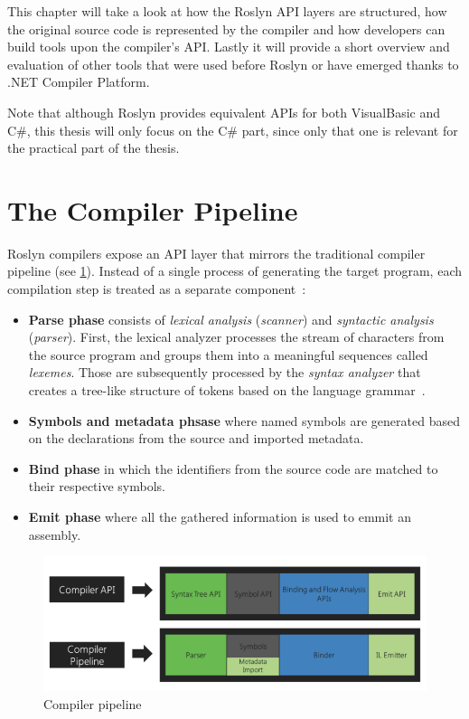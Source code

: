 \documentclass[
  digital, %
  table,   %
  lof,     %
  lot,     %
  oneside,
]{fithesis3}
\begin{document}
This chapter will take a look at how the Roslyn API layers are structured, how the original source code is represented by the compiler and how developers can build tools upon the compiler's API. Lastly it will provide a short overview and evaluation of other tools that were used before Roslyn or have emerged thanks to .NET Compiler Platform.

Note that although Roslyn provides equivalent APIs for both VisualBasic and C\#, this thesis will only focus on the C\# part, since only that one is relevant for the practical part of the thesis.  
  
  \section{The Compiler Pipeline}
Roslyn compilers expose an API layer that mirrors the traditional compiler pipeline (see \ref{fig:roslyn-compiler-pipeline}). Instead of a single process of generating the target program, each compilation step is treated as a separate component~\cite{roslyn-overview}:
\begin{itemize}
  \item \textbf{Parse phase} consists of \textit{lexical analysis} (\textit{scanner}) and \textit{syntactic analysis} (\textit{parser}). First, the lexical analyzer processes the stream of characters from the source program and groups them into a meaningful sequences called \textit{lexemes}. Those are subsequently processed by the \textit{syntax analyzer} that creates a tree-like structure of tokens based on the language grammar~\cite{dragon-book}.
  \item \textbf{Symbols and metadata phsase} where named symbols are generated based on the declarations from the source and imported metadata.
  \item \textbf{Bind phase} in which the identifiers from the source code are matched to their respective symbols.
  \item \textbf{Emit phase} where all the gathered information is used to emmit an assembly.
\end{itemize}

\begin{figure}[h!]
		\centering
			\includegraphics[scale=0.5]{img/roslyn-compiler-pipeline}
		\caption{Compiler pipeline~\cite{roslyn-overview}}
		\label{fig:roslyn-compiler-pipeline}
\end{figure}
\end{document}
